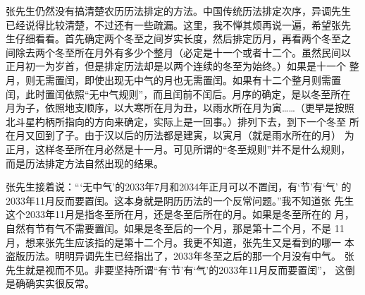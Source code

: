 张先生仍然没有搞清楚农历历法排定的方法。中国传统历法排定次序，异调先生
已经说得比较清楚，不过还有一些疏漏。这里，我不惮其烦再说一遍，希望张先
生仔细看看。首先确定两个冬至之间岁实长度，然后排定历月，再看两个冬至之
间除去两个冬至所在月外有多少个整月（必定是十一个或者十二个。虽然民间以
正月初一为岁首，但是排定历法却是以两个连续的冬至为始终。）如果是十一个
整月，则无需置闰，即使出现无中气的月也无需置闰。如果有十二个整月则需置
闰，此时置闰依照“无中气规则”，而且闰前不闰后。月序的确定，是以冬至所在
月为子，依照地支顺序，以大寒所在月为丑，以雨水所在月为寅……（更早是按照
北斗星杓柄所指向的方向来确定，实际上是一回事。）排列下去，到下一个冬至
所在月又回到了子。由于汉以后的历法都是建寅，以寅月（就是雨水所在的月）
为正月，这样冬至所在月必然是十一月。可见所谓的“冬至规则”并不是什么规则，
而是历法排定方法自然出现的结果。

张先生接着说：“‘无中气’的2033年7月和2034年正月可以不置闰，有‘节’有‘气’
的2033年11月反而要置闰。这本身就是阴历历法的一个反常问题。”我不知道张
先生这个2033年11月是指冬至所在月，还是冬至后所在的月。如果是冬至所在的
月，自然有节有气不需要置闰。如果是冬至后的一个月，那是第十二个月，不是
11月，想来张先生应该指的是第十二个月。我更不知道，张先生又是看到的哪一
本盗版历法。明明异调先生已经指出了，2033年冬至之后的那一个月没有中气。
张先生就是视而不见。非要坚持所谓“有‘节’有‘气’的2033年11月反而要置闰”，
这倒是确确实实很反常。
